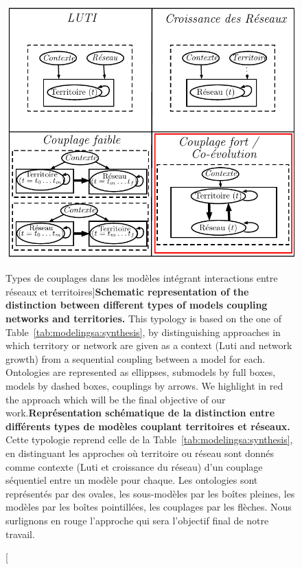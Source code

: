 \begin{figure}[h!]
\includegraphics[width=\linewidth]{Figures/Modelography/coevolution_fr.pdf}
\caption[Types of coupling in models integrating interactions between networks and territories][Types de couplages dans les modèles intégrant interactions entre réseaux et territoires]{\textbf{Schematic representation of the distinction between different types of models coupling networks and territories.} This typology is based on the one of Table~\ref{tab:modelingsa:synthesis}, by distinguishing approaches in which territory or network are given as a context (Luti and network growth) from a sequential coupling between a model for each. Ontologies are represented as ellippses, submodels by full boxes, models by dashed boxes, couplings by arrows. We highlight in red the approach which will be the final objective of our work.\label{fig:modelography:coevolution}}{\textbf{Représentation schématique de la distinction entre différents types de modèles couplant territoires et réseaux.} Cette typologie reprend celle de la Table~\ref{tab:modelingsa:synthesis}, en distinguant les approches où territoire ou réseau sont donnés comme contexte (Luti et croissance du réseau) d'un couplage séquentiel entre un modèle pour chaque. Les ontologies sont représentés par des ovales, les sous-modèles par les boîtes pleines, les modèles par les boîtes pointillées, les couplages par les flèches. Nous surlignons en rouge l'approche qui sera l'objectif final de notre travail.\label{fig:modelography:coevolution}}
\end{figure}

